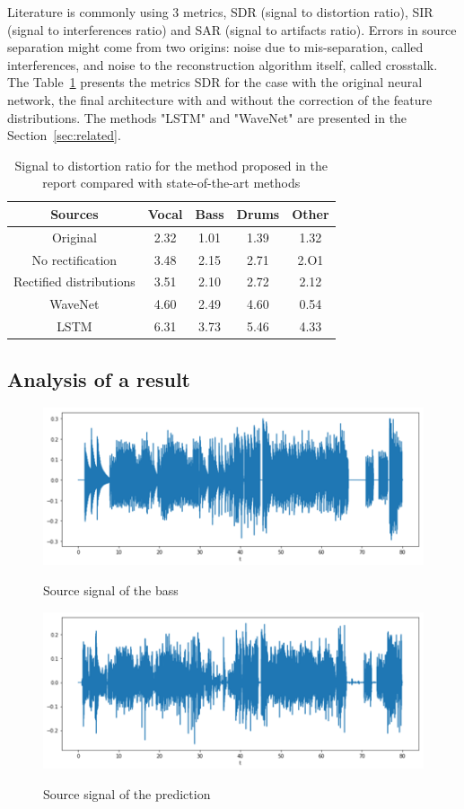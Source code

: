 Literature is commonly using 3 metrics, SDR (signal to distortion ratio),
SIR (signal to interferences ratio) and SAR (signal to artifacts ratio).
Errors in source separation might come from two origins:
noise due to mis-separation, called interferences, and noise to the reconstruction
algorithm itself, called crosstalk.
The Table~\ref{tab:res} presents the metrics SDR for the case with the original
neural network, the final architecture with and without the correction
of the feature distributions.
The methods "LSTM" and "WaveNet" are presented in the Section~\ref{sec:related}.

\begin{table}
  \centering
  \begin{tabular}{|c| c c c c| }
  \hline
    Sources & Vocal & Bass & Drums & Other \\
  \hline
    Original & 2.32 & 1.01 & 1.39 & 1.32 \\
  \hline
    No rectification & 3.48 & 2.15 & 2.71 & 2.O1 \\
  \hline
    Rectified distributions & 3.51 & 2.10 & 2.72 & 2.12 \\
  \hline
    WaveNet & 4.60 & 2.49 & 4.60 & 0.54 \\
  \hline
    LSTM & 6.31 & 3.73 & 5.46 & 4.33 \\
  \hline
  \end{tabular}
  \label{tab:res}
    \caption{Signal to distortion ratio for the method proposed in the report compared with state-of-the-art methods}
\end{table}


\subsection{Analysis of a result}

\begin{figure}
  \centering
  \includegraphics[width=0.8\columnwidth]{bass-src.png}
  \label{fig:bass-src}
  \caption{Source signal of the bass}

  \includegraphics[width=0.8\columnwidth]{bass-pred.png}
  \label{fig:bass-pred}
  \caption{Source signal of the prediction}
\end{figure}

